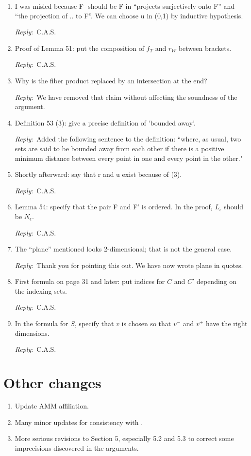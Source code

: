 \documentclass{amsart}
\newcommand{\ar}{\medskip\noindent\textit{Reply}:\ }
\newcommand{\cas}{\ar C.A.S.}
\begin{document}
\begin{enumerate}
	\ar Yes, and it is now explicit in the text. Thank you.

	\item I was misled because F- should be F in “projects surjectively onto F” and “the projection of .. to F”. We can choose u in (0,1) by inductive hypothesis.

	\cas

	\item Proof of Lemma 51: put the composition of $f_T$ and $r_W$ between brackets.

	\cas

	\item Why is the fiber product replaced by an intersection at the end?

	\ar We have removed that claim without affecting the soundness of the argument.

	\item Definition 53 (3): give a precise definition of 'bounded away'.

	\ar Added the following sentence to the definition: ``where, as usual, two sets are said to be bounded away from each other if there is a positive minimum distance between every point in one and every point in the other."

	\item Shortly afterward: say that r and u exist because of (3).

	\cas

	\item Lemma 54: specify that the pair F and F' is ordered. In the proof, $L_\epsilon$ should be $N_\epsilon$.

	\cas

	\item The “plane” mentioned looks 2-dimensional; that is not the general case.

	\ar Thank you for pointing this out. We have now wrote plane in quotes.

	\item First formula on page 31 and later: put indices for $C$ and $C'$ depending on the indexing sets.

	\cas

	\item In the formula for $S$, specify that $v$ is chosen so that $v^-$ and $v^+$ have the right dimensions.

	\cas
\end{enumerate}

\section{Other changes}

\begin{enumerate}
	\item Update AMM affiliation.

	\item Many minor updates for consistency with \cite{medina2022foundations}.

	\item More serious revisions to Section 5, especially 5.2 and 5.3 to correct some imprecisions discovered in the arguments.
\end{enumerate}

\sloppy
\printbibliography
\end{document}
